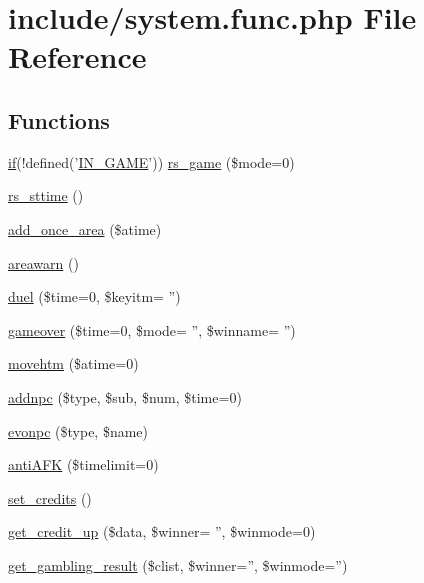 \hypertarget{system_8func_8php}{\section{include/system.func.\+php File Reference}
\label{system_8func_8php}
}
\subsection*{Functions}
\begin{DoxyCompactItemize}
\item 
\hyperlink{login__old_8php_a4ac1118c2e44c513a674bc1793ba6c90}{if}(!defined('\hyperlink{templates_2install_8php_a12c82f3d28569a3f80804f1e72cef14c}{I\+N\+\_\+\+G\+A\+M\+E}')) \hyperlink{system_8func_8php_a0700f78b77b6aeb6945b2bd0ca04f134}{rs\+\_\+game} (\$mode=0)
\item 
\hyperlink{system_8func_8php_ae764df2f770a23f040c01070a8dc7d44}{rs\+\_\+sttime} ()
\item 
\hyperlink{system_8func_8php_a3762c52a26b8b5f6234b7ee5ddeb5929}{add\+\_\+once\+\_\+area} (\$atime)
\item 
\hyperlink{system_8func_8php_ab5774f7a49668cca67ea0669587a9fed}{areawarn} ()
\item 
\hyperlink{system_8func_8php_aca246af1946e5ab6406fe94616b96c41}{duel} (\$time=0, \$keyitm= '')
\item 
\hyperlink{system_8func_8php_a26d027b5de906415c4dbccc51e5d6989}{gameover} (\$time=0, \$mode= '', \$winname= '')
\item 
\hyperlink{system_8func_8php_ad0df96fea34c277bad605420b7def3c7}{movehtm} (\$atime=0)
\item 
\hyperlink{system_8func_8php_a198ddff15878e8601f2deb15e266993d}{addnpc} (\$type, \$sub, \$num, \$time=0)
\item 
\hyperlink{system_8func_8php_ae2218ee4a015fa4132dfebb116748701}{evonpc} (\$type, \$name)
\item 
\hyperlink{system_8func_8php_a7fd1149ca1cf97a693d802c855fc2dea}{anti\+A\+F\+K} (\$timelimit=0)
\item 
\hyperlink{system_8func_8php_aa392db4761906ca9b7144f4a1d316821}{set\+\_\+credits} ()
\item 
\hyperlink{system_8func_8php_afccc15eb1fe26542761a50cc5ff199a4}{get\+\_\+credit\+\_\+up} (\$data, \$winner= '', \$winmode=0)
\item 
\hyperlink{system_8func_8php_a9296dc7d87805dc1cfa7d4744d9f0e40}{get\+\_\+gambling\+\_\+result} (\$clist, \$winner='', \$winmode='')
\end{DoxyCompactItemize}


